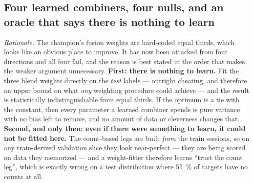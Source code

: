 \documentclass[11pt]{article}
\begin{document}
\subsection{Four learned combiners, four nulls, and an oracle that says there is nothing to learn}
\label{sec:fail-combiners}

\emph{Rationale.} The champion's fusion weights are hard-coded equal thirds,
which looks like an obvious place to improve. It has now been attacked from four
directions and all four fail, and the reason is best stated in the order that
makes the weaker argument unnecessary. \textbf{First: there is nothing to learn.}
Fit the three blend weights directly on the \emph{test} labels --- outright
cheating, and therefore an upper bound on what \emph{any} weighting procedure
could achieve --- and the result is statistically indistinguishable from equal
thirds. If the optimum is a tie with the constant, then every parameter a learned
combiner spends is pure variance with no bias left to remove, and no amount of
data or cleverness changes that. \textbf{Second, and only then: even if there were
something to learn, it could not be fitted here.} The count-based legs are built
\emph{from} the train sessions, so on any train-derived validation slice they look
near-perfect --- they are being scored on data they memorized --- and a
weight-fitter therefore learns ``trust the count leg'', which is exactly wrong on
a test distribution where \SI{55}{\percent} of targets have no counts at all.
\end{document}
